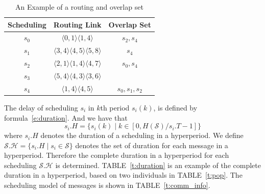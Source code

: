 \documentclass[journal]{IEEEtran}
\newcommand{\calS}{\mathcal{S}}
\newcommand{\calH}{\mathcal{H}}
\theoremstyle{remark}
\begin{document}
\begin{table}[!t]
	\renewcommand{\arraystretch}{1.3}
	\caption{An Example of a routing and overlap set}
	\label{t:overlap}
	\centering
	\begin{tabular}{|c||c||c|}
		\hline
		\textbf{Scheduling} & \textbf{Routing Link}& \textbf{Overlap Set}\\
		\hline
		$s_{0}$ & $ \langle 0,1\rangle\langle 1,4\rangle$ 		& $s_{2},s_{4}$ \\
		\hline
		$s_{1}$ & $ \langle 3,4\rangle\langle 4,5\rangle\langle 5,8\rangle$	& $s_{4}$ \\
		\hline
		$s_{2}$ & $ \langle 2,1\rangle\langle 1,4\rangle\langle 4,7\rangle$ 	& $s_{0},s_{4}$ \\
		\hline		
		$s_{3}$ & $ \langle 5,4\rangle\langle 4,3\rangle\langle 3,6\rangle$ 	& \\
		\hline
		$s_{4}$ & $ \langle 1,4\rangle\langle 4,5\rangle$ 		& $s_{0},s_{1},s_{2}$ \\
		\hline		
	\end{tabular}
\end{table}

The delay of scheduling $s_i$ in $k$th period $s_i(k)$, is defined by formula~\ref{e:duration}.
And we have that
\begin{equation}
	s_i.H = \{ s_i(k) \mid k \in [ 0, H(\calS)/s_i.T - 1 ] \}
\end{equation}
where $s_i.H$ denotes the duration of a scheduling in a hyperperiod.
We define 
 $ \calS.\calH = \{ s_i.H \mid s_i \in \calS \}$
 denotes the set of duration for each message in a hyperperiod. 
Therefore the complete duration in a hyperperiod for each scheduling $ \calS.\calH $ is determined.
TABLE~\ref{t:duration} is an example of the complete duration in a hyperperiod,
 based on two individuals in TABLE~\ref{t:pop}.
The scheduling model of messages is shown in TABLE~\ref{t:comm_info}.
\end{document}
